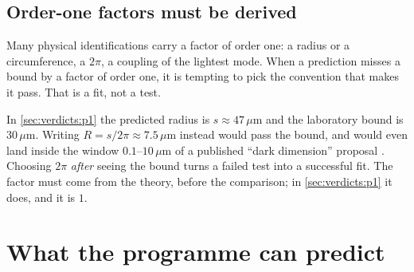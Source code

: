 \subsection{Order-one factors must be derived}

Many physical identifications carry a factor of order one: a radius or a circumference, a
$2\pi$, a coupling of the lightest mode. When a prediction misses a bound by a factor of order
one, it is tempting to pick the convention that makes it pass. That is a fit, not a test.

\begin{pitfallbox}
In \cref{sec:verdicts:p1} the predicted radius is $s\approx47\,\mu$m and the laboratory bound is
$30\,\mu$m. Writing $R=s/2\pi\approx7.5\,\mu$m instead would pass the bound, and would even land
inside the window $0.1$--$10\,\mu$m of a published ``dark dimension'' proposal
. Choosing $2\pi$ \emph{after} seeing the bound turns a failed test
into a successful fit. The factor must come from the theory, before the comparison; in
\cref{sec:verdicts:p1} it does, and it is $1$.
\end{pitfallbox}

\section{What the programme can predict}\label{sec:verdicts:inventory}

